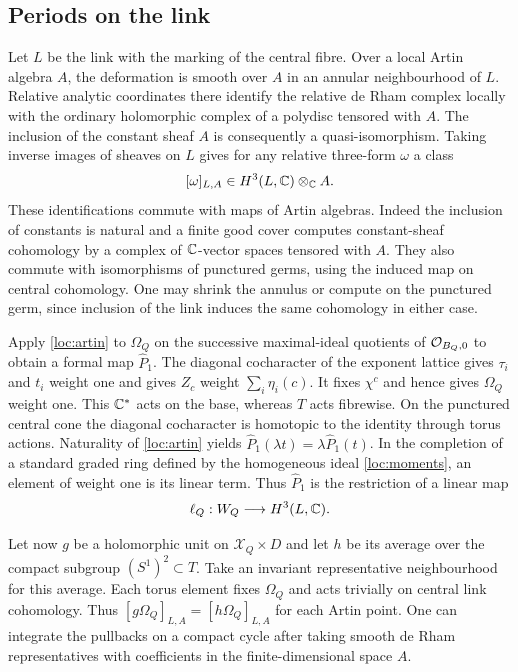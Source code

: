 \subsection{Periods on the link}
Let $L$ be the link with the marking of the central fibre. Over a
local Artin algebra $A$, the deformation is smooth over $A$ in an
annular neighbourhood of $L$. Relative analytic coordinates there
identify the relative de Rham complex locally with the ordinary
holomorphic complex of a polydisc tensored with $A$. The inclusion of
the constant sheaf $A$ is consequently a quasi-isomorphism. Taking
inverse images of sheaves on $L$ gives for any relative three-form
$\omega$ a class
\begin{equation}\label{loc:artin}
                  [\omega]_{L,A}\in H^3(L,\mathbb C)\otimes_\mathbb C A .
\end{equation}
These identifications commute with maps of Artin algebras. Indeed the
inclusion of constants is natural and a finite good cover computes
constant-sheaf cohomology by a complex of $\mathbb C$-vector spaces tensored
with $A$. They also commute with isomorphisms of punctured germs,
using the induced map on central cohomology. One may shrink the annulus
or compute on the punctured germ, since inclusion of the link induces
the same cohomology in either case.

Apply \eqref{loc:artin} to $\Omega_Q$ on the successive maximal-ideal
quotients of $\mathcal O_{B_Q,0}$ to obtain a formal map $\widehat P_1$.
The diagonal cocharacter of the exponent lattice gives $\tau_i$ and
$t_i$ weight one and gives $Z_c$ weight $\sum_i\eta_i(c)$. It fixes
$\chi^c$ and hence gives $\Omega_Q$ weight one. This $\mathbb C^*$ acts on
the base, whereas $T$ acts fibrewise. On the punctured central cone
the diagonal cocharacter is homotopic to the identity through torus
actions. Naturality of \eqref{loc:artin} yields
$\widehat P_1(\lambda t)=\lambda\widehat P_1(t)$.
In the completion of a standard graded ring defined by the homogeneous
ideal \eqref{loc:moments}, an element of weight one is its linear
term. Thus $\widehat P_1$ is the restriction of a linear map
\begin{equation}\label{loc:linear}
                  \ell_Q:W_Q\longrightarrow H^3(L,\mathbb C).
\end{equation}

Let now $g$ be a holomorphic unit on $\mathcal X_Q\times D$ and let
$h$ be its average over the compact subgroup $(S^1)^2\subset T$.
Take an invariant representative neighbourhood for this average.
Each torus element fixes $\Omega_Q$ and acts trivially on central
link cohomology. Thus $[g\Omega_Q]_{L,A}=[h\Omega_Q]_{L,A}$ for each
Artin point. One can integrate the pullbacks on a compact cycle after
taking smooth de Rham representatives with coefficients in the
finite-dimensional space $A$.

